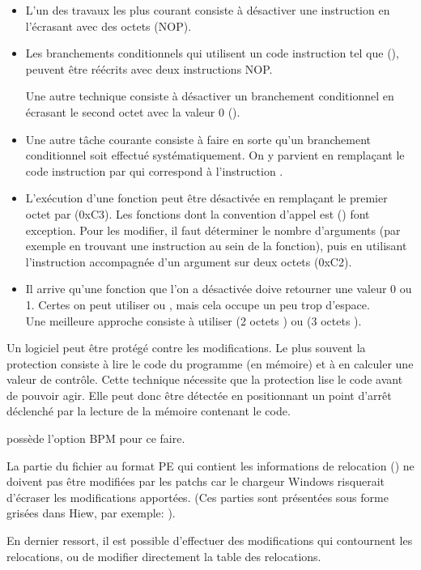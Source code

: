 \begin{itemize}

\item 
L'un des travaux les plus courant consiste à désactiver une instruction en l'écrasant avec des 
octets  (\ac{NOP}).

\item Les branchements conditionnels qui utilisent un code instruction tel que  (\JZ), 
peuvent être réécrits avec deux instructions \ac{NOP}.

Une autre technique consiste à désactiver un branchement conditionnel en écrasant le second octet 
avec la valeur 0 ().

\item 
Une autre tâche courante consiste à faire en sorte qu'un branchement conditionnel soit effectué 
systématiquement. On y parvient en remplaçant le code instruction par  qui correspond à 
l'instruction \JMP.

\item L'exécution d'une fonction peut être désactivée en remplaçant le premier octet par \RETN (0xC3).
Les fonctions dont la convention d'appel est  () font exception. 
Pour les modifier, il faut déterminer le nombre d'arguments (par exemple en trouvant une instruction 
\RETN au sein de la fonction), puis en utilisant l'instruction \RETN accompagnée d'un argument sur 
deux octets (0xC2).

\item Il arrive qu'une fonction que l'on a désactivée doive retourner une valeur 0 ou 1. Certes on 
peut utiliser  ou , mais cela occupe un peu trop d'espace.\\
Une meilleure approche consiste à utiliser  (2 octets ) ou 
 (3 octets ).

\end{itemize}

Un logiciel peut être protégé contre les modifications. Le plus souvent la protection consiste à 
lire le code du programme (en mémoire) et à en calculer une valeur de contrôle.
Cette technique nécessite que la protection lise le code avant de pouvoir agir. Elle peut donc être 
détectée en positionnant un point d'arrêt déclenché par la lecture de la mémoire contenant le code.

\tracer possède l'option BPM pour ce faire.

La partie du fichier au format PE qui contient les informations de relocation () 
ne doivent pas être modifiées par les patchs car le chargeur Windows risquerait d'écraser les 
modifications apportées.
(Ces parties sont présentées sous forme grisées dans Hiew, par exemple:
).

En dernier ressort, il est possible d'effectuer des modifications qui contournent les relocations, 
ou de modifier directement la table des relocations.

